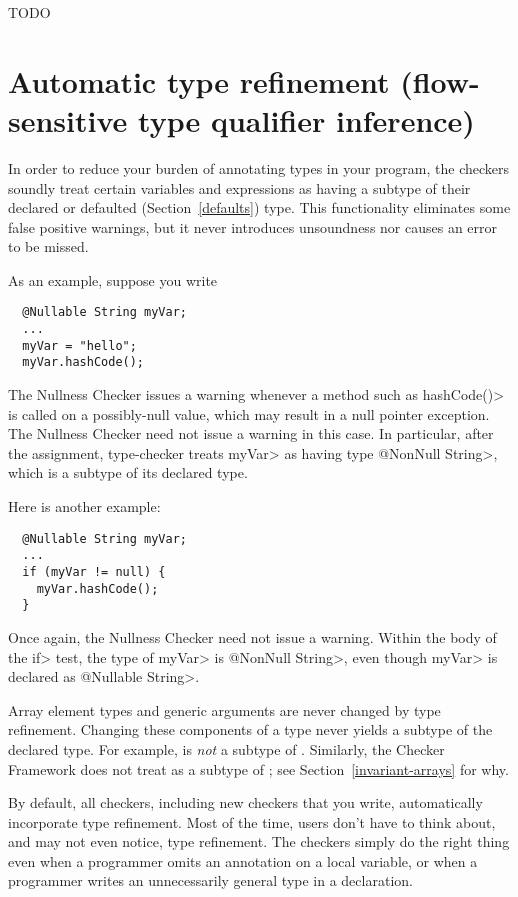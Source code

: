 TODO
\fi


\section{Automatic type refinement (flow-sensitive type qualifier inference)\label{type-refinement}}

In order to reduce your burden of annotating types in your program, the
checkers soundly treat certain variables and expressions as having a
subtype of their declared or defaulted (Section~\ref{defaults})
type.  This functionality eliminates some false positive warnings, but it
never introduces unsoundness nor causes an error to be missed.

As an example, suppose you write

\begin{Verbatim}
  @Nullable String myVar;
  ...
  myVar = "hello";
  myVar.hashCode();
\end{Verbatim}

\noindent
The Nullness Checker issues a warning whenever a method such as
\<hashCode()> is called on a possibly-null value, which  may result in a 
null pointer exception.  The Nullness Checker need not issue a warning in
this case.  In particular, after the assignment, type-checker
treats \<myVar> as having type \<@NonNull String>, which is a subtype of its
declared type.

Here is another example:

\begin{Verbatim}
  @Nullable String myVar;
  ...
  if (myVar != null) {
    myVar.hashCode();
  }
\end{Verbatim}

\noindent
Once again, the Nullness Checker need not issue a warning.  Within the body
of the \<if> test, the type of \<myVar> is \<@NonNull String>, even though
\<myVar> is declared as \<@Nullable String>.


Array element types and generic arguments are never changed by type
refinement.  Changing these components of a type never yields a subtype of
the declared type.  For example,  is \emph{not} a
subtype of .  Similarly, the Checker Framework does not
treat  as a subtype of
; see Section~\ref{invariant-arrays} for why.



By default, all checkers, including new checkers that you write,
automatically incorporate type refinement.  Most of the time, users don't
have to think about, and may not even notice, type refinement.  The
checkers simply do the right thing even when a programmer omits an
annotation on a local variable, or when a programmer writes an
unnecessarily general type in a declaration.

